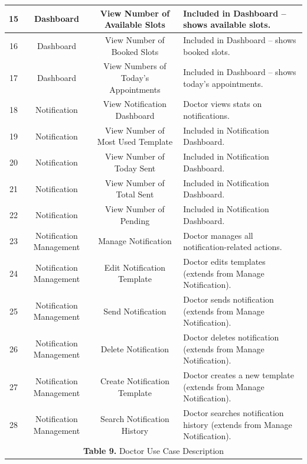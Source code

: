 \documentclass[12pt,a4paper]{article}
\begin{document}
\begin{longtable}{|c|c|c|p{7.5cm}|}
\hline
15 & Dashboard & View Number of Available Slots & Included in Dashboard – shows available slots. \\
\hline
16 & Dashboard & View Number of Booked Slots & Included in Dashboard – shows booked slots. \\
\hline
17 & Dashboard & View Numbers of Today's Appointments & Included in Dashboard – shows today's appointments. \\
\hline
18 & Notification & View Notification Dashboard & Doctor views stats on notifications. \\
\hline
19 & Notification & View Number of Most Used Template & Included in Notification Dashboard. \\
\hline
20 & Notification & View Number of Today Sent & Included in Notification Dashboard. \\
\hline
21 & Notification & View Number of Total Sent & Included in Notification Dashboard. \\
\hline
22 & Notification & View Number of Pending & Included in Notification Dashboard. \\
\hline
23 & Notification Management & Manage Notification & Doctor manages all notification-related actions. \\
\hline
24 & Notification Management & Edit Notification Template & Doctor edits templates (extends from Manage Notification). \\
\hline
25 & Notification Management & Send Notification & Doctor sends notification (extends from Manage Notification). \\
\hline
26 & Notification Management & Delete Notification & Doctor deletes notification (extends from Manage Notification). \\
\hline
27 & Notification Management & Create Notification Template & Doctor creates a new template (extends from Manage Notification). \\
\hline
28 & Notification Management & Search Notification History & Doctor searches notification history (extends from Manage Notification). \\
\hline

\hline
\multicolumn{4}{|c|}{\textbf{Table 9.} Doctor Use Case Description} \\
\hline
\end{longtable}
\end{document}
